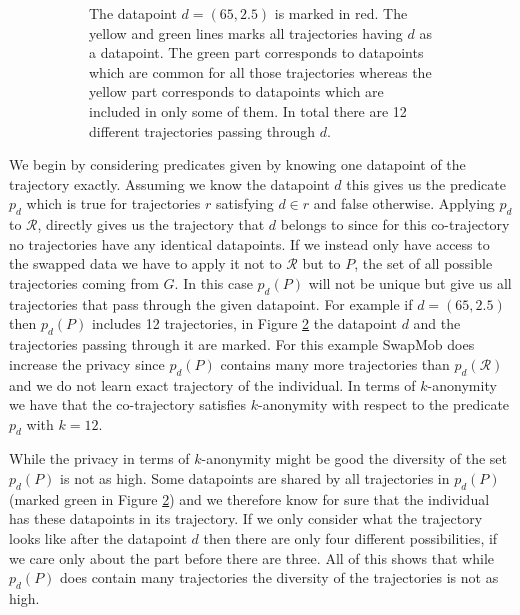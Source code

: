 \documentclass[12pt]{article}
\newcommand{\data}{d}
\newcommand{\traj}{r}
\newcommand{\cotraj}{\mathcal{R}}
\newcommand{\pred}{p}
\newcommand{\DAG}{G}
\newcommand{\paths}{P}
\theoremstyle{definition}
\begin{document}
\begin{figure}
\begin{subfigure}[t]{0.49\textwidth}
    \caption{The datapoint \(\data = (65, 2.5)\) is marked in red.
      The yellow and green lines marks all trajectories having
      \(\data\) as a datapoint. The green part corresponds to
      datapoints which are common for all those trajectories whereas
      the yellow part corresponds to datapoints which are included
      in only some of them. In total there are 12 different
      trajectories passing through \(\data\).}
    \label{fig:graph-swap-big-example-marked}
  \end{subfigure}
  \caption{}
\end{figure}

We begin by considering predicates given by knowing one datapoint of
the trajectory exactly. Assuming we know the datapoint \(\data\)
this gives us the predicate \(\pred_{\data}\) which is true for
trajectories \(\traj\) satisfying \(\data \in \traj\) and false
otherwise. Applying \(\pred_{\data}\) to \(\cotraj\), directly gives
us the trajectory that \(\data\) belongs to since for this
co-trajectory no trajectories have any identical datapoints. If we
instead only have access to the swapped data we have to apply it not
to \(\cotraj\) but to \(\paths\), the set of all possible trajectories
coming from \(\DAG\). In this case \(\pred_{\data}(\paths)\) will not
be unique but give us all trajectories that pass through the given
datapoint. For example if \(\data = (65, 2.5)\) then
\(\pred_{\data}(\paths)\) includes 12 trajectories, in Figure
\ref{fig:graph-swap-big-example-marked} the datapoint \(\data\) and
the trajectories passing through it are marked. For this example
SwapMob does increase the privacy since \(\pred_{\data}(\paths)\)
contains many more trajectories than \(\pred_{\data}(\cotraj)\) and we
do not learn exact trajectory of the individual. In terms of
\(k\)-anonymity we have that the co-trajectory satisfies
\(k\)-anonymity with respect to the predicate \(\pred_{\data}\) with
\(k = 12\).

While the privacy in terms of \(k\)-anonymity might be good the
diversity of the set \(\pred_{\data}(\paths)\) is not as high. Some
datapoints are shared by all trajectories in
\(\pred_{\data}(\paths)\) (marked green in Figure
\ref{fig:graph-swap-big-example-marked}) and we therefore know for
sure that the individual has these datapoints in its trajectory. If
we only consider what the trajectory looks like after the datapoint
\(\data\) then there are only four different possibilities, if we care
only about the part before there are three. All of this shows that
while \(\pred_{\data}(\paths)\) does contain many trajectories the
diversity of the trajectories is not as high.
\end{document}
